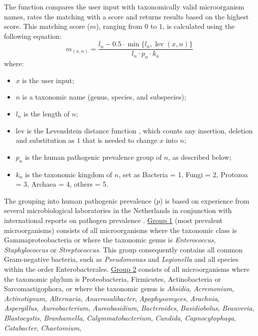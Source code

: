 \documentclass[article, shortnames]{jss}
\newcommand{\fct}[1]{\code{#1()}}
\begin{document}
The \fct{as.mo} function compares the user input with taxonomically valid
microorganism names, rates the matching with a score and returns results
based on the highest score.  This matching score ($m$), ranging from $0$ to
$1$, is calculated using the following equation:
%
\begin{equation*}
\label{eq:mo_uncertainty}
m_{(x,n)} = \frac{l_{n} - 0.5 \cdot \min\{ l_n, \operatorname{lev}(x,n) \} }{l_{n} \cdot p_{n} \cdot k_{n}}
\end{equation*}
%
where:
%
\begin{itemize}
  \item{$x$ is the user input;}
  \item{$n$ is a taxonomic name (genus, species, and subspecies);}
  \item{$l_n$ is the length of $n$;}
  \item{lev is the Levenshtein distance function \citep{Levenshtein1966},
  which counts any insertion, deletion and substitution as $1$ that is needed
  to change $x$ into $n$;}
  \item{$p_n$ is the human pathogenic prevalence group of $n$, as described
  below;}
  \item{$k_n$ is the taxonomic kingdom of $n$, set as Bacteria = 1, Fungi = 2,
  Protozoa = 3, Archaea = 4, others = 5.}
\end{itemize}
%
The grouping into human pathogenic prevalence ($p$) is based on experience
from several microbiological laboratories in the Netherlands in conjunction
with international reports on pathogen prevalence \citep{De_Greeff2019-xl,
EARS_Net, World_Health_Organization2018-bn}.  \underline{Group 1} (most
prevalent microorganisms) consists of all microorganisms where the taxonomic
class is Gammaproteobacteria or where the taxonomic genus is
\emph{Enterococcus}, \emph{Staphylococcus} or \emph{Streptococcus}.  This
group consequently contains all common Gram-negative bacteria, such as
\emph{Pseudomonas} and \emph{Legionella} and all species within the order
Enterobacterales.  \underline{Group 2} consists of all microorganisms where
the taxonomic phylum is Proteobacteria, Firmicutes, Actinobacteria or
Sarcomastigophora, or where the taxonomic genus is \emph{Absidia},
\emph{Acremonium}, \emph{Actinotignum}, \emph{Alternaria},
\emph{Anaerosalibacter}, \emph{Apophysomyces}, \emph{Arachnia},
\emph{Aspergillus}, \emph{Aureobacterium}, \emph{Aureobasidium},
\emph{Bacteroides}, \emph{Basidiobolus}, \emph{Beauveria},
\emph{Blastocystis}, \emph{Branhamella}, \emph{Calymmatobacterium},
\emph{Candida}, \emph{Capnocytophaga}, \emph{Catabacter}, \emph{Chaetomium},
\end{document}
